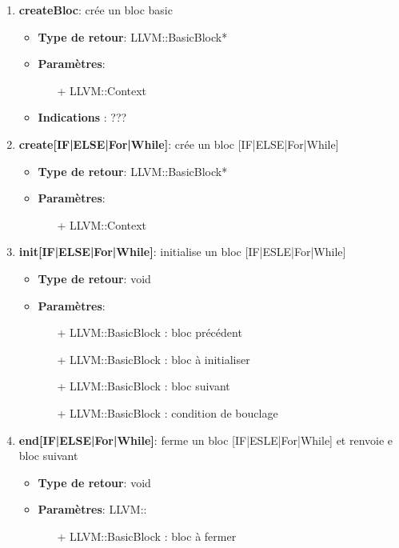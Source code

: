 \documentclass{article}
\begin{document}
  \begin{enumerate}
  \item \textbf{createBloc}: crée un bloc basic
  \begin{itemize}
    \item \textbf{Type de retour}: LLVM::BasicBlock*
    \item \textbf{Paramètres}:
    \begin{enumerate}
      \item[+] LLVM::Context
    \end{enumerate}
    \item \textbf{Indications} : ??? 
  \end{itemize}

  \item \textbf{create[IF|ELSE|For|While]}: crée un bloc [IF|ELSE|For|While]
  \begin{itemize}
    \item \textbf{Type de retour}: LLVM::BasicBlock*
    \item \textbf{Paramètres}:
    \begin{enumerate}
      \item[+] LLVM::Context
    \end{enumerate}
  \end{itemize} 

  \item \textbf{init[IF|ELSE|For|While]}: initialise un bloc [IF|ESLE|For|While]
  \begin{itemize}
    \item \textbf{Type de retour}: void
    \item \textbf{Paramètres}:
    \begin{enumerate}
      \item[+] LLVM::BasicBlock : bloc précédent
      \item[+] LLVM::BasicBlock : bloc à initialiser
      \item[+] LLVM::BasicBlock : bloc suivant
      \item[+] LLVM::BasicBlock : condition de bouclage      
    \end{enumerate}
  \end{itemize} 

  \item \textbf{end[IF|ELSE|For|While]}: ferme un bloc [IF|ESLE|For|While] et renvoie e bloc suivant
  \begin{itemize}
    \item \textbf{Type de retour}: void
    \item \textbf{Paramètres}: LLVM::
    \begin{enumerate}
      \item[+] LLVM::BasicBlock : bloc à fermer
    \end{enumerate}
  \end{itemize} 


  \end{enumerate}
\end{document}
